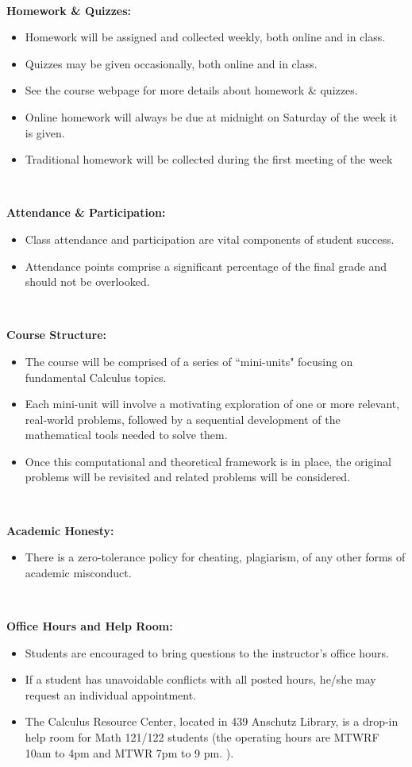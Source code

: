 \documentclass[10pt]{amsart}
\begin{document}
\,\,

{\bf Homework \& Quizzes:}
\begin{itemize}
	\item Homework will be assigned and collected weekly, both online and in class.
	\item Quizzes may be given occasionally, both online and in class.
	\item See the course webpage for more details about homework \& quizzes.
	\item Online homework will always be due at midnight on Saturday of the week it is given.
	\item Traditional homework will be collected during the first meeting of the week
\end{itemize}

\,\,

{\bf Attendance \& Participation:}
\begin{itemize}
	\item Class attendance and participation are vital components of student success.
	\item Attendance points comprise a significant percentage of the final grade and should not be overlooked.
\end{itemize}

\,\,

{\bf Course Structure:}
\begin{itemize}
	\item The course will be comprised of a series of ``mini-units" focusing on fundamental Calculus topics.  
	\item Each mini-unit will involve a motivating exploration of one or more relevant, real-world problems, followed by a sequential development of the mathematical tools needed to solve them.  
	\item Once this computational and theoretical framework is in place, the original problems will be revisited and related problems will be considered.
\end{itemize}

\,\,

{\bf Academic Honesty:}
\begin{itemize}
	\item There is a zero-tolerance policy for cheating, plagiarism, of any other forms of academic misconduct.  
\end{itemize}

\,\,

{\bf Office Hours and Help Room:}
\begin{itemize}
	\item Students are encouraged to bring questions to the instructor's office hours.
	\item If a student has unavoidable conflicts with all posted hours, he/she may request an individual appointment.
	\item The Calculus Resource Center, located in 439 Anschutz Library, is a drop-in help room for Math 121/122 students (the operating hours are MTWRF 10am to 4pm and
MTWR 7pm to 9 pm. ).
\end{itemize}
\end{document}
